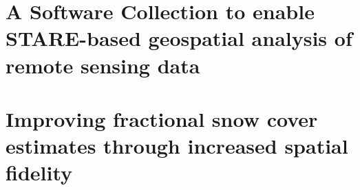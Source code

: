 \documentclass[oneside,11pt,final]{sty/ucthesis-CA2012}
\begin{document}
\begin{mainmatter}
\chapter{A Software Collection to enable STARE-based geospatial analysis of remote sensing data}
\glsresetall


\chapter{Improving fractional snow cover estimates through increased spatial fidelity}
\label{chapter_3}
\glsresetall





\end{mainmatter}

\ssp
%
%
\printbibliography
\end{document}
